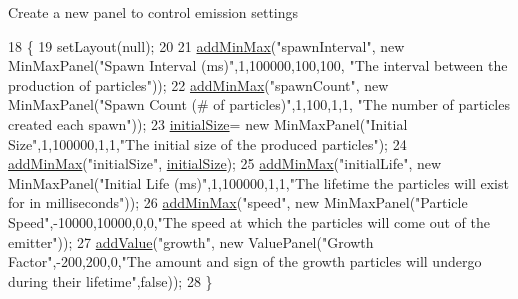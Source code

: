 Create a new panel to control emission settings 
\begin{DoxyCode}
18                               \{
19         setLayout(null);
20     
21         \mbox{\hyperlink{classorg_1_1newdawn_1_1slick_1_1tools_1_1peditor_1_1_control_panel_aae097ab8bc9bd722af51818b15bcc823}{addMinMax}}(\textcolor{stringliteral}{"spawnInterval"}, \textcolor{keyword}{new} MinMaxPanel(\textcolor{stringliteral}{"Spawn Interval (ms)"},1,100000,100,100, \textcolor{stringliteral}{"The
       interval between the production of particles"}));
22         \mbox{\hyperlink{classorg_1_1newdawn_1_1slick_1_1tools_1_1peditor_1_1_control_panel_aae097ab8bc9bd722af51818b15bcc823}{addMinMax}}(\textcolor{stringliteral}{"spawnCount"}, \textcolor{keyword}{new} MinMaxPanel(\textcolor{stringliteral}{"Spawn Count (# of particles)"},1,100,1,1, \textcolor{stringliteral}{"The
       number of particles created each spawn"}));
23         \mbox{\hyperlink{classorg_1_1newdawn_1_1slick_1_1tools_1_1peditor_1_1_emission_controls_af1ec12d55f0bf1f45d7e55e0fdc2a945}{initialSize}}= \textcolor{keyword}{new} MinMaxPanel(\textcolor{stringliteral}{"Initial Size"},1,100000,1,1,\textcolor{stringliteral}{"The initial size of the
       produced particles"});
24         \mbox{\hyperlink{classorg_1_1newdawn_1_1slick_1_1tools_1_1peditor_1_1_control_panel_aae097ab8bc9bd722af51818b15bcc823}{addMinMax}}(\textcolor{stringliteral}{"initialSize"}, \mbox{\hyperlink{classorg_1_1newdawn_1_1slick_1_1tools_1_1peditor_1_1_emission_controls_af1ec12d55f0bf1f45d7e55e0fdc2a945}{initialSize}});
25         \mbox{\hyperlink{classorg_1_1newdawn_1_1slick_1_1tools_1_1peditor_1_1_control_panel_aae097ab8bc9bd722af51818b15bcc823}{addMinMax}}(\textcolor{stringliteral}{"initialLife"}, \textcolor{keyword}{new} MinMaxPanel(\textcolor{stringliteral}{"Initial Life (ms)"},1,100000,1,1,\textcolor{stringliteral}{"The lifetime
       the particles will exist for in milliseconds"}));
26         \mbox{\hyperlink{classorg_1_1newdawn_1_1slick_1_1tools_1_1peditor_1_1_control_panel_aae097ab8bc9bd722af51818b15bcc823}{addMinMax}}(\textcolor{stringliteral}{"speed"}, \textcolor{keyword}{new} MinMaxPanel(\textcolor{stringliteral}{"Particle Speed"},-10000,10000,0,0,\textcolor{stringliteral}{"The speed at which
       the particles will come out of the emitter"}));
27         \mbox{\hyperlink{classorg_1_1newdawn_1_1slick_1_1tools_1_1peditor_1_1_control_panel_af298d1803e4450ed4ffe735500bb7c60}{addValue}}(\textcolor{stringliteral}{"growth"}, \textcolor{keyword}{new} ValuePanel(\textcolor{stringliteral}{"Growth Factor"},-200,200,0,\textcolor{stringliteral}{"The amount and sign of the
       growth particles will undergo during their lifetime"},\textcolor{keyword}{false}));
28     \}
\end{DoxyCode}


